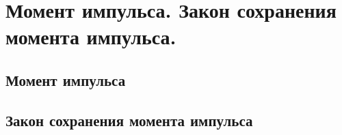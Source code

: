 \chapter{Момент импульса. Закон сохранения момента импульса.}

\section{Момент импульса}
\section{Закон сохранения момента импульса}
